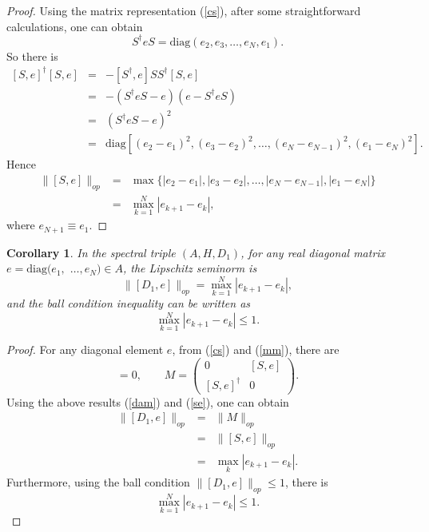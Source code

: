 \documentclass[a4paper,11pt]{article}
\newtheorem{corollary}{Corollary}
\begin{document}
\begin{proof}
Using the matrix representation (\ref{cs}), after some straightforward calculations, one can obtain
  \begin{equation}
    S^{\dagger} eS = \mathrm{diag} (e_2, e_3, \ldots, e_N, e_1).
  \end{equation}
So there is
  \begin{eqnarray}
    {}[S, e]^{\dag} [S, e] & = & - [S^{\dag}, e] SS^{\dag} [S, e] \nonumber\\
    & = & - (S^{\dag} eS - e)  (e - S^{\dag} eS) \nonumber\\
    & = & (S^{\dag} eS - e)^2 \nonumber\\
    & = & \mathrm{diag} [(e_2 - e_1)^2, (e_3 - e_2)^2, \ldots, (e_N - e_{N -
    1})^2, (e_1 - e_N)^2] . 
  \end{eqnarray}
  Hence
  \begin{eqnarray}
    \|[S, e]\|_{op} & = & \max \{|e_2 - e_1 |, |e_3 - e_2 |, \ldots, |e_N -
    e_{N - 1} |, |e_1 - e_N |\} \nonumber\\
    & = & \max_{k = 1}^N |e_{k + 1} - e_k |, 
  \end{eqnarray}
  where $e_{N + 1} \equiv e_1$.
\end{proof}

\begin{corollary}
In the spectral triple $(A, H, D_1)$, for any real diagonal matrix $e =
  \mathrm{diag} (e_1,$ $\ldots, e_N) \in A$, the Lipschitz seminorm is
  \begin{equation}
    \|[D_1, e]\|_{op} = \max_{k = 1}^N |e_{k + 1} - e_k |,
  \end{equation}
  and the ball condition inequality can be written as
  \begin{equation}
    \max_{k = 1}^N |e_{k + 1} - e_k | \leqslant 1.
  \end{equation}
\end{corollary}

\begin{proof}
  For any diagonal element $e$, from (\ref{cs}) and (\ref{mm}), there are
  \begin{equation}
    [C, e] = 0, \qquad M = \left( \begin{array}{cc}
      0 & [S, e]\\
      {}[S, e]^{\dag} & 0
    \end{array} \right) .
  \end{equation}
  Using the above results (\ref{dam}) and (\ref{se}), one can obtain
  \begin{eqnarray}
    \|[D_1, e]\|_{op} & = & \|M\|_{op} \nonumber\\
    & = & \|[S, e]\|_{op} \nonumber\\
    & = & \max_k |e_{k + 1} - e_k |. 
  \end{eqnarray}
Furthermore, using the ball condition $\|[D_1, e]\|_{op}\leqslant 1$, there is
\begin{equation}
	\max_{k = 1}^N |e_{k + 1} - e_k | \leqslant 1.
\end{equation}
\end{proof}
\end{document}

